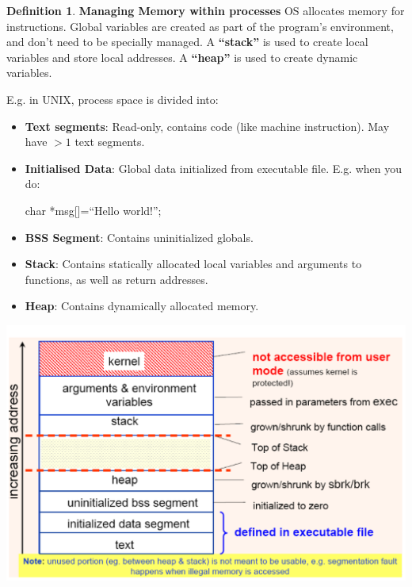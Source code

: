 \documentclass[11pt,a4paper]{article}
\theoremstyle{definition}
\newtheorem{definition}{Definition}[section]
\newenvironment{myitemize}
{ \begin{itemize}
    \setlength{\itemsep}{5pt}
    \setlength{\parskip}{0pt}
    \setlength{\parsep}{0pt}     }
{ \end{itemize}                  }
\begin{document}
\begin{definition}{\textbf{Managing Memory within processes}}
	OS allocates memory for instructions. Global variables are created as part of the program’s environment, and don’t need to be specially managed. A \textbf{``stack''} is used to create local variables and store local addresses. A \textbf{``heap''} is used to create dynamic variables.
	
\begin{minipage}{0.55\linewidth}
	E.g. in UNIX, process space is divided into:
	\begin{myitemize}
		\item \textbf{Text segments}: Read-only, contains code (like machine instruction). May have $>1$ text segments.
		\item \textbf{Initialised Data}: Global data initialized from executable file. E.g. when you do: 

		char *msg[]=``Hello world!'';
		\item \textbf{BSS Segment}: Contains uninitialized globals.
		\item \textbf{Stack}: Contains statically allocated local variables and arguments to functions, as well as return addresses.
		\item \textbf{Heap}: Contains dynamically allocated memory.
	\end{myitemize}
\end{minipage}
\begin{minipage}{0.45\linewidth}
	\includegraphics[width=\linewidth]{m4/processMemory}
\end{minipage}

\end{definition}
\end{document}
